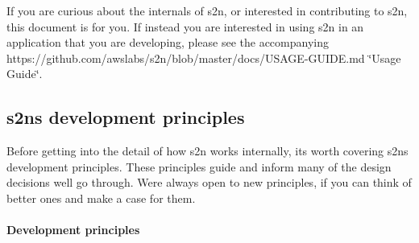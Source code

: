 If you are curious about the internals of s2n, or interested in contributing to s2n, this document is for you. If instead you are interested in using s2n in an application that you are developing, please see the accompanying https\+://github.com/awslabs/s2n/blob/master/docs/\+U\+S\+A\+G\+E-\/\+G\+U\+I\+D\+E.\+md \char`\"{}\+Usage Guide\char`\"{}.

\subsection*{s2n\textquotesingle{}s development principles}

Before getting into the detail of how s2n works internally, it\textquotesingle{}s worth covering s2n\textquotesingle{}s development principles. These principles guide and inform many of the design decisions we\textquotesingle{}ll go through. We\textquotesingle{}re always open to new principles, if you can think of better ones and make a case for them.

\paragraph*{Development principles}


